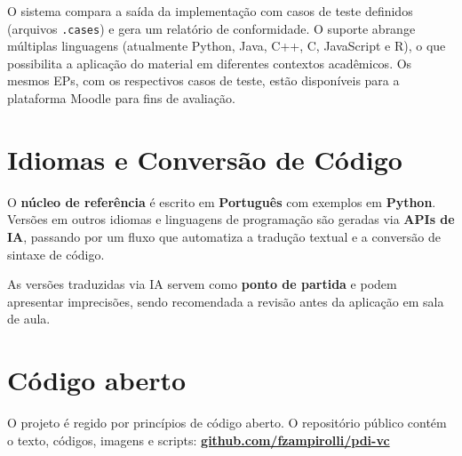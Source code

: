 \documentclass[
  portuguese,
  letterpaper,
  openany,
  oneside,
  12pt,
  a4paper]{book}
\begin{document}
O sistema compara a saída da implementação com casos de teste definidos
(arquivos \texttt{.cases}) e gera um relatório de conformidade. O
suporte abrange múltiplas linguagens (atualmente Python, Java, C++, C,
JavaScript e R), o que possibilita a aplicação do material em diferentes
contextos acadêmicos. Os mesmos EPs, com os respectivos casos de teste,
estão disponíveis para a plataforma Moodle para fins de avaliação.

\section*{Idiomas e Conversão de
Código}\label{idiomas-e-conversuxe3o-de-cuxf3digo}


O \textbf{núcleo de referência} é escrito em \textbf{Português} com
exemplos em \textbf{Python}. Versões em outros idiomas e linguagens de
programação são geradas via \textbf{APIs de IA}, passando por um fluxo
que automatiza a tradução textual e a conversão de sintaxe de código.

\begin{tcolorbox}[enhanced jigsaw, coltitle=black, colback=white, colbacktitle=quarto-callout-note-color!10!white, bottomtitle=1mm, left=2mm, opacityback=0, breakable, rightrule=.15mm, titlerule=0mm, toptitle=1mm, opacitybacktitle=0.6, title=\textcolor{quarto-callout-note-color}{\faInfo}\hspace{0.5em}{Nota}, colframe=quarto-callout-note-color-frame, arc=.35mm, bottomrule=.15mm, toprule=.15mm, leftrule=.75mm]

As versões traduzidas via IA servem como \textbf{ponto de partida} e
podem apresentar imprecisões, sendo recomendada a revisão antes da
aplicação em sala de aula.

\end{tcolorbox}

\section*{Código aberto}\label{cuxf3digo-aberto}


O projeto é regido por princípios de código aberto. O repositório
público contém o texto, códigos, imagens e scripts:
\textbf{\href{https://github.com/fzampirolli/pdi-vc/}{github.com/fzampirolli/pdi-vc}}
\end{document}

